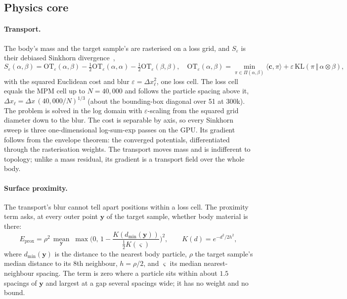 \subsection{Physics core}
\paragraph{Transport.} The body's mass and the target sample's are rasterised on a loss grid, and $S_\varepsilon$ is
their debiased Sinkhorn divergence~\citep{feydy2019sinkhorn},
\begin{equation}
S_\varepsilon(\alpha,\beta)=\mathrm{OT}_\varepsilon(\alpha,\beta)-\tfrac12\mathrm{OT}_\varepsilon(\alpha,\alpha)
 -\tfrac12\mathrm{OT}_\varepsilon(\beta,\beta),\quad
\mathrm{OT}_\varepsilon(\alpha,\beta)=\min_{\pi\in\Pi(\alpha,\beta)}\langle\mathbf{c},\pi\rangle
 +\varepsilon\,\mathrm{KL}(\pi\,\Vert\,\alpha\otimes\beta),
\end{equation}
with the squared Euclidean cost and blur $\varepsilon=\Delta x_\ell^2$, one loss cell. The loss cell equals the MPM
cell up to $N=40{,}000$ and follows the particle spacing above it,
$\Delta x_\ell=\Delta x\,(40{,}000/N)^{1/3}$ (about the bounding-box diagonal over 51 at 300k). The problem is solved
in the log domain with $\varepsilon$-scaling from the squared grid diameter down to the blur. The cost is separable by
axis, so every Sinkhorn sweep is three one-dimensional log-sum-exp passes on the GPU. Its gradient follows from the
envelope theorem: the converged potentials, differentiated through the rasterisation weights. The transport moves
mass and is indifferent to topology; unlike a mass residual, its gradient is a transport field over the whole body.

\paragraph{Surface proximity.} The transport's blur cannot tell apart positions within a loss cell. The proximity
term asks, at every outer point $\mathbf{y}$ of the target sample, whether body material is there:
\begin{equation}
E_{\mathrm{prox}}=\rho^2\,\operatorname*{mean}_{\mathbf{y}}\;
 \max\!\Big(0,\,1-\frac{K(d_{\min}(\mathbf{y}))}{\tfrac12K(\varsigma)}\Big)^{2},
 \qquad K(d)=e^{-d^2/2h^2},
\end{equation}
where $d_{\min}(\mathbf{y})$ is the distance to the nearest body particle, $\rho$ the target sample's median distance
to its 8th neighbour, $h=\rho/2$, and $\varsigma$ its median nearest-neighbour spacing. The term is zero where a
particle sits within about $1.5$ spacings of $\mathbf{y}$ and largest at a gap several spacings wide; it has no
weight and no bound.

